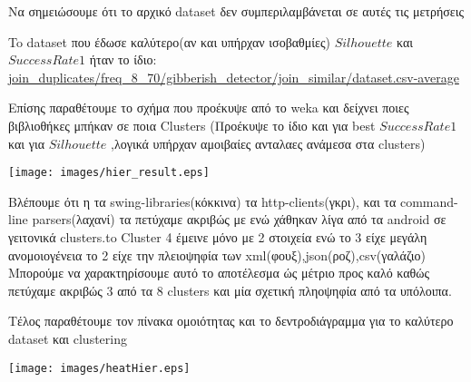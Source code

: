 Να σημειώσουμε ότι το αρχικό dataset δεν συμπεριλαμβάνεται σε αυτές τις μετρήσεις



To dataset που έδωσε καλύτερο(αν και υπήρχαν ισοβαθμίες) $Silhouette$ και $Success Rate 1$ ήταν το ίδιο: \\ \url{join_duplicates/freq_8_70/gibberish_detector/join_similar/dataset.csv-average}\\

\begin{minipage}{\linewidth}
	\centering
	\label{my-label}
\end{minipage}

Επίσης παραθέτουμε το σχήμα που προέκυψε από το weka και δείχνει ποιες
βιβλιοθήκες μπήκαν σε ποια Clusters (Προέκυψε το ίδιο και για best $Success Rate 1$ και για $Silhouette$ ,λογικά υπήρχαν αμοιβαίες ανταλαες ανάμεσα στα clusters)

\noindent\begin{minipage}{\linewidth}
	\texttt{[image: images/hier\_result.eps]}
	\label{fig:clustering}
\end{minipage}

Βλέπουμε ότι η τα swing-libraries(κόκκινα) τα http-clients(γκρι), 
και τα command-line parsers(λαχανί) τα πετύχαμε ακριβώς με ενώ χάθηκαν 
λίγα από τα android σε γειτονικά clusters.to Cluster 4 έμεινε μόνο με 2 στοιχεία ενώ το 3 είχε μεγάλη ανομοιογένεια το 2 είχε την πλειοψηφία των xml(φουξ),json(ροζ),csv(γαλάζιο)
Μπορούμε να χαρακτηρίσουμε αυτό το αποτέλεσμα ώς μέτριο προς καλό
καθώς πετύχαμε ακριβώς 3 από τα 8 clusters και μία σχετική πληοψηφία από τα υπόλοιπα.


Τέλος παραθέτουμε τον πίνακα ομοιότητας και το δεντροδιάγραμμα για το καλύτερο dataset και clustering

\noindent\begin{minipage}{\linewidth}
	\texttt{[image: images/heatHier.eps]}
	\label{fig:Heat}
\end{minipage}

